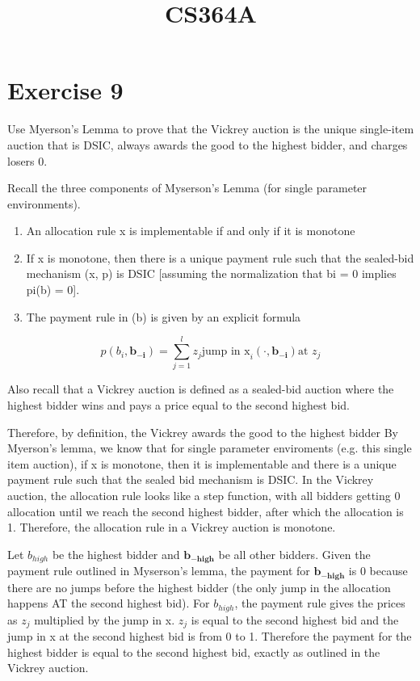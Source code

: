 \documentclass{article}
\title{CS364A \exerciseset}
\author{\studentname}
\begin{document}
\maketitle

\section*{Exercise 9}
Use Myerson’s Lemma to prove that the Vickrey auction is the unique single-item auction that is DSIC,
always awards the good to the highest bidder, and charges losers 0.

Recall the three components of Myserson's Lemma (for single parameter
environments).
\begin{enumerate}
\item An allocation rule x is implementable if and only if it is monotone
\item If x is monotone, then there is a unique payment rule such that the sealed-bid mechanism (x, p) is DSIC [assuming the normalization that bi = 0 implies pi(b) = 0]. 
\item The payment rule in (b) is given by an explicit formula 
\end{enumerate}

\begin{equation}
	p(b_i, \bm{b_{-i}}) = \sum_{j=1}^{l}z_j\text{jump in x}_i(\cdot,
	\bm{b_{-i}})\text{at $z_j$}
\end{equation}

Also recall that a Vickrey auction is defined as a sealed-bid auction where
the highest bidder wins and pays a price equal to the second highest bid.

Therefore, by definition, the Vickrey awards the good to the highest bidder
By Myerson's lemma, we know that for single parameter
enviroments (e.g. this single item auction), if x is monotone, then it is
implementable and there is a unique payment rule such that the sealed bid
mechanism is DSIC. In the Vickrey auction, the allocation rule looks like a
step function, with all bidders getting 0 allocation until we reach the
second highest bidder, after which the allocation is 1. Therefore, the
allocation rule in a Vickrey auction is monotone.

Let $b_{high}$ be the highest bidder and $\bm{b_{-high}}$ be all other
bidders.  Given the payment rule outlined in Myserson's lemma, the payment for
$\bm{b_{-high}}$ is 0 because there are no jumps before the highest bidder
(the only jump in the allocation happens AT the second highest bid).  For
$b_{high}$, the payment rule gives the prices as $z_j$ multiplied by the jump
in x.  $z_j$ is equal to the second highest bid and the jump in x at the
second highest bid is from 0 to 1.  Therefore the payment for the highest
bidder is equal to the second highest bid, exactly as outlined in the Vickrey
auction. 
\end{document}
